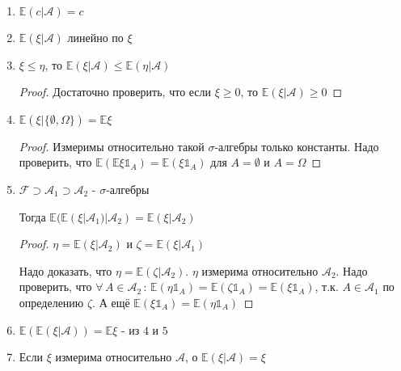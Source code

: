 \begin{properties}
    \begin{enumerate}
        \item $\mathbb{E} (c | \mathcal{A}) = c$
        \item $\mathbb{E} (\xi | \mathcal{A})$ линейно по $\xi$
        \item {$\xi \leqslant \eta$, то $\mathbb{E} (\xi | \mathcal{A}) \leqslant \mathbb{E} (\eta | \mathcal{A})$
            \begin{proof}
                Достаточно проверить, что если $\xi \geqslant 0$, то $\mathbb{E} (\xi | \mathcal{A}) \geqslant 0$
            \end{proof}
        }
        \item {
            $\mathbb{E} (\xi | \{ \emptyset, \Omega \}) = \mathbb{E} \xi$

            \begin{proof}
                Измеримы относительно такой $\sigma$-алгебры только константы. Надо проверить, что $\mathbb{E} (\mathbb{E} \xi \mathds{1}_A) = \mathbb{E} (\xi \mathds{1}_A)$ для $A = \emptyset$ и $A = \Omega$
            \end{proof}
        }
        \item {
            $\mathcal{F} \supset \mathcal{A}_1 \supset \mathcal{A}_2$ - $\sigma$-алгебры

            Тогда $\mathbb{E} (\mathbb{E} (\xi | \mathcal{A}_1) | \mathcal{A}_2) = \mathbb{E} (\xi | \mathcal{A}_2)$

            \begin{proof}
                $\eta = \mathbb{E} (\xi | \mathcal{A}_2)$ и $\zeta = \mathbb{E} (\xi | \mathcal{A}_1)$

                Надо доказать, что $\eta = \mathbb{E} (\zeta | \mathcal{A}_2)$. $\eta$ измерима относительно $\mathcal{A_2}$. Надо проверить, что 
                $\forall \, A \in \mathcal{A}_2 \, : \, \mathbb{E} (\eta \mathds{1}_A) = \mathbb{E} (\zeta \mathds{1}_A) = \mathbb{E} (\xi \mathds{1}_A)$, т.к. $A \in \mathcal{A}_1$ по определению $\zeta$. А ещё
                $\mathbb{E} (\xi \mathds{1}_A) = \mathbb{E} (\eta \mathds{1}_A)$
            \end{proof}
        }
        \item {
            $\mathbb{E} (\mathbb{E} (\xi | \mathcal{A})) = \mathbb{E} \xi$ - из $4$ и $5$
        }
        \item {
            Если $\xi$ измерима относительно $\mathcal{A}$, о $\mathbb{E} (\xi | \mathcal{A}) = \xi$
        }
    \end{enumerate}
\end{properties}

